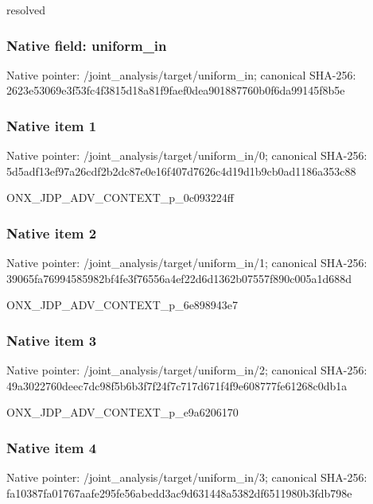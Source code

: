 \documentclass[10pt,a4paper]{article}
\begin{document}
\begingroup\raggedright\sloppy resolved\par\endgroup

\subsubsection{Native field: uniform\_\allowbreak{}in}
Native pointer: /joint\_\allowbreak{}analysis/target/uniform\_\allowbreak{}in; canonical SHA-256: 2623e53069e3f53fc4f3815d18a81f9faef0dea901887760b0f6da99145f8b5e

\subsubsection{Native item 1}
Native pointer: /joint\_\allowbreak{}analysis/target/uniform\_\allowbreak{}in/0; canonical SHA-256: 5d5adf13ef97a26cdf2b2dc87e0e16f407d7626c4d19d1b9cb0ad1186a353c88

\begingroup\raggedright\sloppy ONX\_\allowbreak{}JDP\_\allowbreak{}ADV\_\allowbreak{}CONTEXT\_\allowbreak{}p\_\allowbreak{}0c093224ff\par\endgroup

\subsubsection{Native item 2}
Native pointer: /joint\_\allowbreak{}analysis/target/uniform\_\allowbreak{}in/1; canonical SHA-256: 39065fa76994585982bf4fe3f76556a4ef22d6d1362b07557f890c005a1d688d

\begingroup\raggedright\sloppy ONX\_\allowbreak{}JDP\_\allowbreak{}ADV\_\allowbreak{}CONTEXT\_\allowbreak{}p\_\allowbreak{}6e898943e7\par\endgroup

\subsubsection{Native item 3}
Native pointer: /joint\_\allowbreak{}analysis/target/uniform\_\allowbreak{}in/2; canonical SHA-256: 49a3022760deec7dc98f5b6b3f7f24f7c717d671f4f9e608777fe61268c0db1a

\begingroup\raggedright\sloppy ONX\_\allowbreak{}JDP\_\allowbreak{}ADV\_\allowbreak{}CONTEXT\_\allowbreak{}p\_\allowbreak{}e9a6206170\par\endgroup

\subsubsection{Native item 4}
Native pointer: /joint\_\allowbreak{}analysis/target/uniform\_\allowbreak{}in/3; canonical SHA-256: fa10387fa01767aafe295fe56abedd3ac9d631448a5382df6511980b3fdb798e
\end{document}

